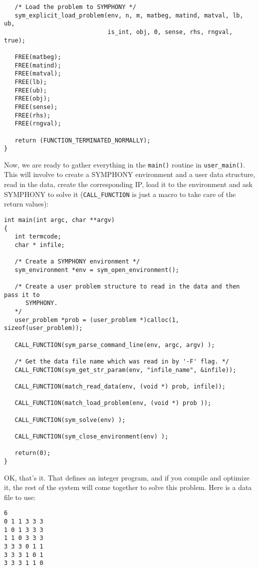 \documentclass[11pt]{article}
\begin{document}
{\begin{verbatim}
   /* Load the problem to SYMPHONY */   
   sym_explicit_load_problem(env, n, m, matbeg, matind, matval, lb, ub, 
                             is_int, obj, 0, sense, rhs, rngval, true);
			     
   FREE(matbeg);
   FREE(matind);
   FREE(matval);
   FREE(lb);
   FREE(ub);
   FREE(obj);
   FREE(sense);
   FREE(rhs);
   FREE(rngval);

   return (FUNCTION_TERMINATED_NORMALLY);
}
\end{verbatim}

Now, we are ready to gather everything in the \texttt{main()} routine in 
\texttt{user\_main()}. This will involve to create a SYMPHONY environment and 
a user data structure, read in the data, create the corresponding IP, 
load it to the environment and ask SYMPHONY to solve it 
(\texttt{CALL\_FUNCTION} is just a macro to take care of the return values):  

\begin{verbatim}
int main(int argc, char **argv)
{
   int termcode;
   char * infile;

   /* Create a SYMPHONY environment */
   sym_environment *env = sym_open_environment();

   /* Create a user problem structure to read in the data and then pass it to  
      SYMPHONY. 
   */
   user_problem *prob = (user_problem *)calloc(1, sizeof(user_problem));

   CALL_FUNCTION(sym_parse_command_line(env, argc, argv) );

   /* Get the data file name which was read in by '-F' flag. */
   CALL_FUNCTION(sym_get_str_param(env, "infile_name", &infile));

   CALL_FUNCTION(match_read_data(env, (void *) prob, infile));

   CALL_FUNCTION(match_load_problem(env, (void *) prob ));

   CALL_FUNCTION(sym_solve(env) );

   CALL_FUNCTION(sym_close_environment(env) );

   return(0);
}
\end{verbatim}

OK, that's it. That defines an integer program, and if you compile and
optimize it, the rest of the system will come together to solve this problem.
Here is a data file to use:
\begin{verbatim}
6
0 1 1 3 3 3
1 0 1 3 3 3
1 1 0 3 3 3
3 3 3 0 1 1
3 3 3 1 0 1
3 3 3 1 1 0
\end{verbatim}

}
\end{document}
